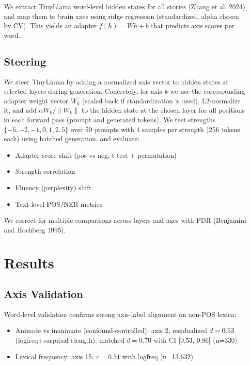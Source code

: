\documentclass[
]{article}
\begin{document}
We extract TinyLlama word-level hidden states for all stories (Zhang et
al. 2024) and map them to brain axes using ridge regression
(standardized, alpha chosen by CV). This yields an adapter \(f(h)=Wh+b\)
that predicts axis scores per word.

\subsection{Steering}\label{steering}

We steer TinyLlama by adding a normalized axis vector to hidden states
at selected layers during generation. Concretely, for axis \(k\) we use
the corresponding adapter weight vector \(W_k\) (scaled back if
standardization is used), L2-normalize it, and add
\(\alpha W_k/\|W_k\|\) to the hidden state at the chosen layer for all
positions in each forward pass (prompt and generated tokens). We test
strengths \(\{-5,-2,-1,0,1,2,5\}\) over 50 prompts with 4 samples per
strength (256 tokens each) using batched generation, and evaluate:

\begin{itemize}
\item
  Adapter-score shift (pos vs neg, t-test + permutation)
\item
  Strength correlation
\item
  Fluency (perplexity) shift
\item
  Text-level POS/NER metrics
\end{itemize}

We correct for multiple comparisons across layers and axes with FDR
(Benjamini and Hochberg 1995).

\section{Results}\label{results}

\subsection{Axis Validation}\label{axis-validation}

Word-level validation confirms strong axis-label alignment on non-POS
lexica:

\begin{itemize}
\item
  Animate vs inanimate (confound-controlled): axis 2, residualized
  \(d=0.53\) (logfreq+surprisal+length), matched \(d=0.70\) with CI
  {[}0.53, 0.86{]} (n=330)
\item
  Lexical frequency: axis 15, \(r=0.51\) with logfreq (n=13,632)
\end{itemize}
\end{document}
